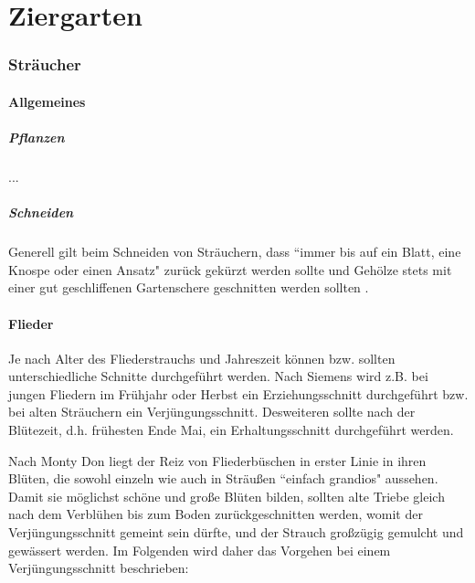 \part{Ziergarten}

\pagebreak

\section{Sträucher}
\label{Sträucher}

\subsection{Allgemeines}

\subsubsection{Pflanzen}

...

\subsubsection{Schneiden}

Generell gilt beim Schneiden von Sträuchern, dass ``immer bis auf ein Blatt, eine Knospe oder einen Ansatz" zurück gekürzt werden sollte und Gehölze stets mit einer gut geschliffenen Gartenschere geschnitten werden sollten \cite[S.~257]{Don2021}.

\subsection{Flieder}

Je nach Alter des Fliederstrauchs und Jahreszeit können bzw. sollten unterschiedliche Schnitte durchgeführt werden.
Nach Siemens \cite{Siemens2021} wird z.B. bei jungen Fliedern im Frühjahr oder Herbst ein Erziehungsschnitt durchgeführt bzw. bei alten Sträuchern ein Verjüngungsschnitt.
Desweiteren sollte nach der Blütezeit, d.h. frühesten Ende Mai, ein Erhaltungsschnitt durchgeführt werden.

Nach Monty Don \cite[S.~258]{Don2021} liegt der Reiz von Fliederbüschen in erster Linie in ihren Blüten, die sowohl einzeln wie auch in Sträußen ``einfach grandios" aussehen.
Damit sie möglichst schöne und große Blüten bilden, sollten alte Triebe gleich nach dem Verblühen bis zum Boden zurückgeschnitten werden, womit der Verjüngungsschnitt gemeint sein dürfte, und der Strauch großzügig gemulcht und gewässert werden.
Im Folgenden wird daher das Vorgehen bei einem Verjüngungsschnitt beschrieben:

